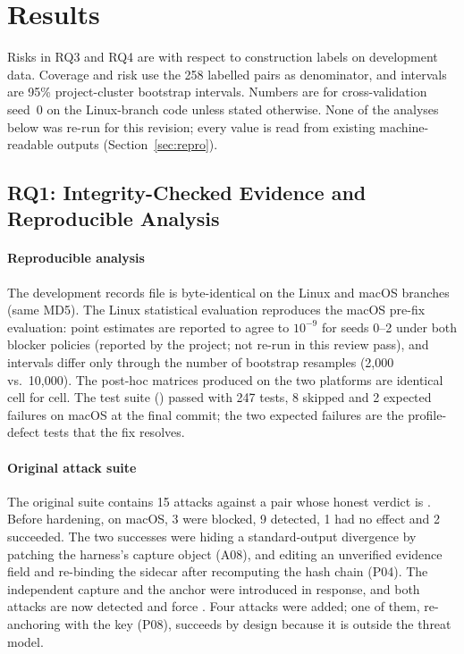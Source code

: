 \section{Results}\label{sec:results}

Risks in RQ3 and RQ4 are with respect to construction labels on development data. Coverage and risk use the 258 labelled pairs as denominator, and intervals are 95\% project-cluster bootstrap intervals. Numbers are for cross-validation seed~0 on the Linux-branch code unless stated otherwise. None of the analyses below was re-run for this revision; every value is read from existing machine-readable outputs (Section~\ref{sec:repro}).

\subsection{RQ1: Integrity-Checked Evidence and Reproducible Analysis}\label{sec:res-rq1}
\paragraph*{Reproducible analysis} The development records file is byte-identical on the Linux and macOS branches (same MD5). The Linux statistical evaluation reproduces the macOS pre-fix evaluation: point estimates are reported to agree to $10^{-9}$ for seeds 0--2 under both blocker policies (reported by the project; not re-run in this review pass), and intervals differ only through the number of bootstrap resamples (2{,}000 vs.\ 10{,}000). The post-hoc \ers{} matrices produced on the two platforms are identical cell for cell. The \sbg{} test suite () passed with 247 tests, 8 skipped and 2 expected failures on macOS at the final commit; the two expected failures are the profile-defect tests that the fix resolves.

\paragraph*{Original attack suite} The original suite contains 15 attacks against a pair whose honest verdict is \DIV{}. Before hardening, on macOS, 3 were blocked, 9 detected, 1 had no effect and 2 succeeded. The two successes were hiding a standard-output divergence by patching the harness's capture object (A08), and editing an unverified evidence field and re-binding the sidecar after recomputing the hash chain (P04). The independent capture and the anchor were introduced in response, and both attacks are now detected and force \INS{}. Four attacks were added; one of them, re-anchoring with the key (P08), succeeds by design because it is outside the threat model.

